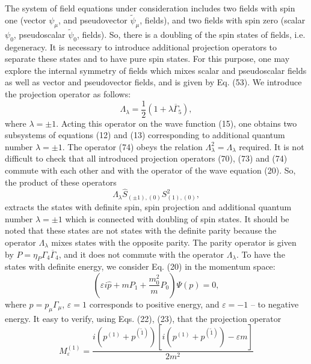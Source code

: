 \documentclass[a4paper,12pt]{article}
\begin{document}
The system of field equations under consideration includes two
fields with spin one (vector $\psi _\mu $, and pseudovector
$\widetilde{\psi }_\mu $, fields), and two fields with spin zero
(scalar $ \psi _0$, pseudoscalar $\widetilde{\psi }_0$, fields).
So, there is a doubling of the spin states of fields, i.e.
degeneracy. It is necessary to introduce additional projection
operators to separate these states and to have pure spin states.
For this purpose, one may explore the internal symmetry of fields
which mixes scalar and pseudoscalar fields as well as vector and
pseudovector fields, and is given by Eq. (53). We introduce the
projection operator as follows:
\begin{equation}
\Lambda _\lambda =\frac 12\left( 1+\lambda \overline{\Gamma
}_5\right) , \label{74}
\end{equation}
where $\lambda =\pm 1$. Acting this operator on the wave function
(15), one obtains two subsystems of equations (12) and (13)
corresponding to additional quantum number $\lambda =\pm 1$. The
operator (74) obeys the relation $\Lambda _\lambda ^2=\Lambda
_\lambda $ required. It is not difficult to check that all
introduced projection operators (70), (73) and (74) commute with
each other and with the operator of the wave equation (20). So,
the product of these operators
\begin{equation}
\Lambda _\lambda\widehat{S}_{(\pm 1), (0)}S_{(1), (0)}^2 ,
\label{75}
\end{equation}
extracts the states with definite spin, spin projection and
additional quantum number $\lambda =\pm 1$ which is connected with
doubling of spin states. It should be noted that these states are
not states with the definite parity because the operator $\Lambda
_\lambda$ mixes states with the opposite parity. The parity
operator is given by $P=\eta_P \Gamma_4 \overline{\Gamma }_4$, and
it does not commute with the operator $\Lambda _\lambda$. To have
the states with definite energy, we consider Eq. (20) in the
momentum space:
\begin{equation}
\left( \varepsilon i\widehat{p} + m P_1+\frac{m_0^2}{m}P_0\right)
\Psi (p)=0 ,\label{76}
\end{equation}
where $\widehat{p}=p_\mu \Gamma _\mu $, $\varepsilon=1$
corresponds to positive energy, and  $\varepsilon=-1$ -- to
negative energy. It easy to verify, using Eqs. (22), (23), that
the projection operator
\[
M^{(1)}_\varepsilon =\frac{i\left(
p^{(1)}+p^{(\widetilde{1})}\right)\left[ i\left( p^{(1)}+
p^{(\widetilde{1})}\right) - \varepsilon m\right]}{2m^2}
\]
\end{document}
